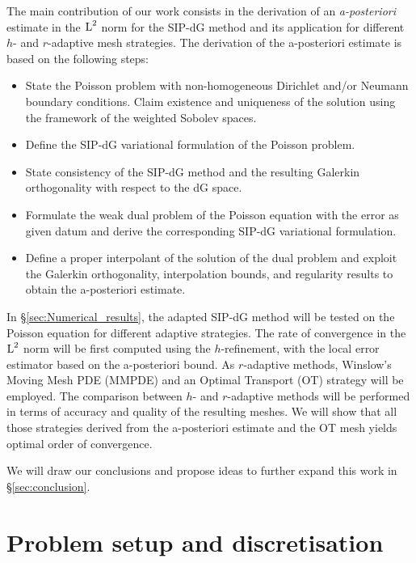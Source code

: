 \documentclass[a4paper,11pt]{article}
\begin{document}
The main contribution of our work consists in the derivation of an \textit{a-posteriori} estimate in the $\operatorname L^{2}$ norm for the SIP-dG method and its application for different $h$- and $r$-adaptive mesh strategies. The derivation of the a-posteriori estimate is based on the following steps:

\begin{itemize}
    \item State the Poisson problem with non-homogeneous Dirichlet and/or Neumann boundary conditions. Claim existence and uniqueness of the solution using the framework of the weighted Sobolev spaces. 
    
    \item Define the SIP-dG variational formulation of the Poisson problem.
    
    \item State consistency of the SIP-dG method and the resulting Galerkin orthogonality with respect to the dG space.
    
    \item Formulate the weak dual problem of the Poisson equation with the error as given datum and derive the corresponding SIP-dG variational formulation.
    
    \item Define a proper interpolant of the solution of the dual problem and exploit the Galerkin orthogonality, interpolation bounds, and regularity results \cite{BG:1988} to obtain the a-posteriori estimate.   
    
\end{itemize}

In \S \ref{sec:Numerical_results}, the adapted SIP-dG method will be tested on the Poisson equation for different adaptive strategies. The rate of convergence in the $\operatorname L^{2}$ norm will be first computed using the $h$-refinement, with the local error estimator based on the a-posteriori bound. As $r$-adaptive methods, Winslow's Moving Mesh PDE (MMPDE) and an Optimal Transport (OT) strategy will be employed. The comparison between $h$- and $r$-adaptive methods will be performed in terms of accuracy and quality of the resulting meshes. We will show that all those strategies derived from the a-posteriori estimate and the OT mesh yields optimal order of convergence.

We will draw our conclusions and propose ideas to further expand this work in \S \ref{sec:conclusion}.

\section{Problem setup and discretisation}
\end{document}
